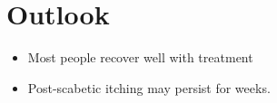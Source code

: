\section{Outlook}
\begin{itemize}[noitemsep]
  \item Most people recover well with treatment
  \item Post-scabetic itching may persist for weeks.
\end{itemize}
